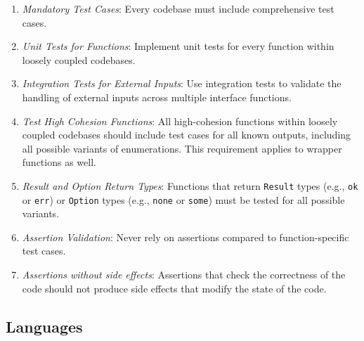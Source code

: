 \documentclass[9pt]{IEEEtran} %
\begin{document}
\begin{enumerate}
  \item \textit{Mandatory Test Cases}: Every codebase must include comprehensive test cases. 
  \item \textit{Unit Tests for Functions}: Implement unit tests for every function within loosely coupled codebases. 
  \item \textit{Integration Tests for External Inputs}: Use integration tests to validate the handling of external inputs across multiple interface functions.
  \item \textit{Test High Cohesion Functions}: All high-cohesion functions within loosely coupled codebases should include test cases for all known outputs, including all possible variants of enumerations. This requirement applies to wrapper functions as well.
  \item \textit{Result and Option Return Types}: Functions that return \texttt{Result} types (e.g., \texttt{ok} or \texttt{err}) or \texttt{Option} types (e.g., \texttt{none} or \texttt{some}) must be tested for all possible variants. 
  \item \textit{Assertion Validation}: Never rely on assertions compared to function-specific test cases. 
  \item \textit{Assertions without side effects}: Assertions that check the correctness of the code should not produce side effects that modify the state of the code.
\end{enumerate}

\subsection{Languages}
\label{ESSLanguages}
\end{document}
